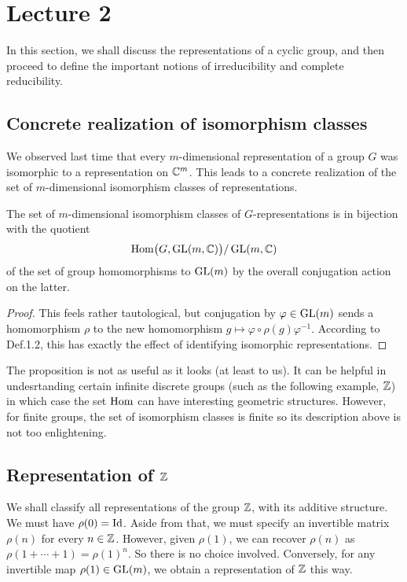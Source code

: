 \chapter{Lecture 2}
In this section, we shall discuss the representations of a cyclic group,
and then proceed to define the important notions of irreducibility and
complete reducibility.
\section{Concrete realization of isomorphism classes}
We observed last time that every \(m\)-dimensional representation of a
group \(G\) was isomorphic to a representation on \(\mathbb{C}^m\). This leads to
a concrete realization of the set of \(m\)-dimensional isomorphism classes
of representations.

\begin{proposition}
  The set of \(m\)-dimensional isomorphism classes of \(G\)-representations
  is in bijection with the quotient
  \[
    \operatorname{Hom}\bigl(G,\operatorname{GL}(m,\mathbb{C})\bigr)/\operatorname{GL}(m,\mathbb{C})
  \]
  of the set of group homomorphisms to \(\operatorname{GL}(m)\) by the overall
  conjugation action on the latter.
\end{proposition}
\begin{proof}
  This feels rather tautological, but conjugation by \(\varphi\in\operatorname{GL}(m)\)
  sends a homomorphism \(\rho\) to the new homomorphism
  \(g\mapsto \varphi\circ\rho(g)\varphi^{-1}\). According to Def.\@ 1.2,
  this has exactly the effect of identifying isomorphic representations.
\end{proof}

\begin{remark}
  The proposition is not as useful as it looks (at least to us). It can be
  helpful in undesrtanding certain infinite discrete groups (such as the
  following example, \(\mathbb{Z}\)) in which case the set \(\operatorname{Hom}\) can have
  interesting geometric structures. However, for finite groups, the set of
  isomorphism classes is finite so its description above is not too
  enlightening.
\end{remark}

\section{Representation of \(\mathbb{Z}\)}
We shall classify all representations of the group \(\mathbb{Z}\), with its
additive structure. We must have \(\rho(0)=\operatorname{Id}\). Aside from that, we must
specify an invertible matrix \(\rho(n)\) for every \(n\in\mathbb{Z}\). However,
given \(\rho(1)\), we can recover \(\rho(n)\) as
\(\rho(1+\dotsb+1)=\rho(1)^n\). So there is no choice involved. Conversely,
for any invertible map \(\rho(1)\in\operatorname{GL}(m)\), we obtain a representation of
\(\mathbb{Z}\) this way.

